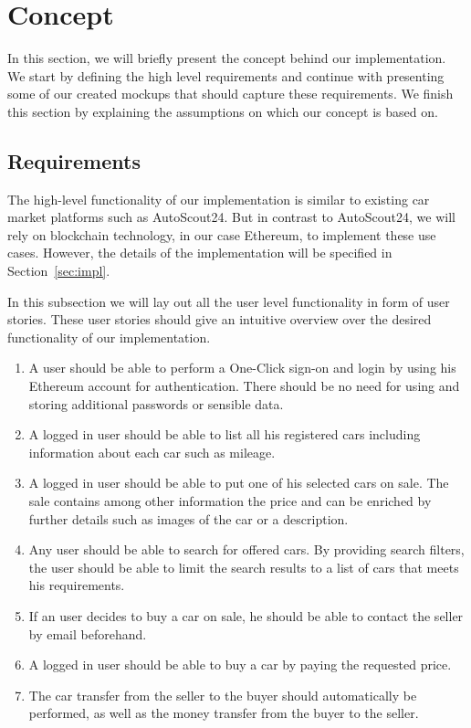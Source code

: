 \section{Concept}\label{sec:concept}

In this section, we will briefly present the concept behind our implementation. We start by defining the high level requirements and continue with presenting some of our created mockups that should capture these requirements. We finish this section by explaining the assumptions on which our concept is based on.

\subsection{Requirements}\label{req}

The high-level functionality of our implementation is similar to existing car market platforms such as AutoScout24. But in contrast to AutoScout24, we will rely on blockchain technology, in our case Ethereum, to implement these use cases. However, the details of the implementation will be specified in Section~\ref{sec:impl}.

In this subsection we will lay out all the user level functionality in form of user stories. These user stories should give an intuitive overview over the desired functionality of our implementation.

\begin{enumerate}
  \item A user should be able to perform a One-Click sign-on and login by using his Ethereum account for authentication. There should be no need for using and storing additional passwords or sensible data.

  \item A logged in user should be able to list all his registered cars including information about each car such as mileage.

  \item A logged in user should be able to put one of his selected cars on sale. The sale contains among other information the price and can be enriched by further details such as images of the car or a description.

  \item Any user should be able to search for offered cars. By providing search filters, the user should be able to limit the search results to a list of cars that meets his requirements.

  \item If an user decides to buy a car on sale, he should be able to contact the seller by email beforehand.

  \item A logged in user should be able to buy a car by paying the requested price.

  \item The car transfer from the seller to the buyer should automatically be performed, as well as the money transfer from the buyer to the seller.

\end{enumerate}

